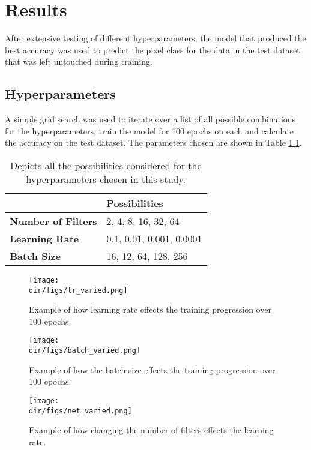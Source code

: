 \chapter{Results}
After extensive testing of different hyperparameters, the model that produced the best accuracy was used to predict the pixel class for the data in the test dataset that was left untouched during training. 
\section{Hyperparameters}
A simple grid search was used to iterate over a list of all possible combinations for the hyperparameters, train the model for 100 epochs on each and calculate the accuracy on the test dataset. The parameters chosen are shown in Table \ref{tab.grid_search}. 
\begin{table}[htbp]
\centering 
\begin{tabular}{l|l}
                           & \textbf{Possibilities}   \\ \hline
\textbf{Number of Filters} & 2, 4, 8, 16, 32, 64      \\ 
\textbf{Learning Rate}     & 0.1, 0.01, 0.001, 0.0001 \\ 
\textbf{Batch Size}        & 16, 12, 64, 128, 256     \\ 
\end{tabular}
\caption[Hyperparameter possibilities]{Depicts all the possibilities considered for the hyperparameters chosen in this study.}
\label{tab.grid_search}
\end{table}
\begin{figure}[htpb]
    \centering
    \texttt{[image: \\dir/figs/lr\_varied.png]}
    \caption[Example of the effect of changing the learning rate]{Example of how learning rate effects the training progression over 100 epochs.}
    \label{fig.lr_varied}
\end{figure}

\begin{figure}[htpb]
    \centering
    \texttt{[image: \\dir/figs/batch\_varied.png]}
    \caption[Example of the effect of changing the batch size]{Example of how the batch size effects the training progression over 100 epochs.}
    \label{fig.batch_varied}
\end{figure}

\begin{figure}[htpb]
    \centering
    \texttt{[image: \\dir/figs/net\_varied.png]}
    \caption[Example of the effect of changing the number of filters in each Convolution layer]{Example of how changing the number of filters effects the learning rate.}
    \label{fig.net_varied}
\end{figure}
